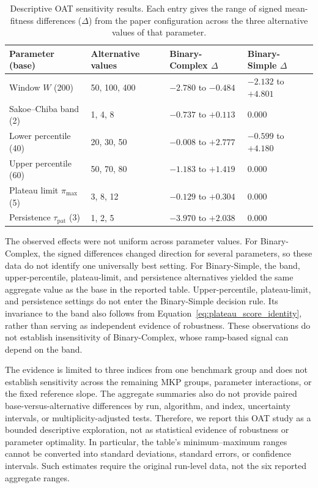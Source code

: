 \documentclass[journal,article,submit,moreauthors]{Definitions/mdpi}
\begin{document}
\begin{table}[htbp]
  \centering
  \small
  \caption{Descriptive OAT sensitivity results. Each entry gives the range of
  signed mean-fitness differences ($\Delta$) from the paper configuration
  across the three alternative values of that parameter.}
  \label{tab:oat_sensitivity}
  \begin{tabular}{llll}
    \toprule
    Parameter (base) & Alternative values & Binary-Complex $\Delta$ & Binary-Simple $\Delta$ \\
    \midrule
    Window $W$ (200) & 50, 100, 400 & $-2.780$ to $-0.484$ & $-2.132$ to $+4.801$ \\
    Sakoe--Chiba band (2) & 1, 4, 8 & $-0.737$ to $+0.113$ & $0.000$ \\
    Lower percentile (40) & 20, 30, 50 & $-0.008$ to $+2.777$ & $-0.599$ to $+4.180$ \\
    Upper percentile (60) & 50, 70, 80 & $-1.183$ to $+1.419$ & $0.000$ \\
    Plateau limit $\pi_{\max}$ (5) & 3, 8, 12 & $-0.129$ to $+0.304$ & $0.000$ \\
    Persistence $\tau_{\mathrm{pat}}$ (3) & 1, 2, 5 & $-3.970$ to $+2.038$ & $0.000$ \\
    \bottomrule
  \end{tabular}
\end{table}

The observed effects were not uniform across parameter values. For
Binary-Complex, the signed differences changed direction for several
parameters, so these data do not identify one universally best setting. For
Binary-Simple, the band, upper-percentile, plateau-limit, and persistence
alternatives yielded the same aggregate value as the base in the reported
table. Upper-percentile, plateau-limit, and persistence settings do not
enter the Binary-Simple decision rule. Its invariance to the band also
follows from Equation~\ref{eq:plateau_score_identity}, rather than serving
as independent evidence of robustness. These observations do not establish
insensitivity of Binary-Complex, whose ramp-based signal can depend on the band.

The evidence is limited to three indices from one benchmark group and does
not establish sensitivity across the remaining MKP groups, parameter
interactions, or the fixed reference slope. The aggregate summaries also do
not provide paired base-versus-alternative differences by run, algorithm,
and index, uncertainty intervals, or multiplicity-adjusted tests. Therefore,
we report this OAT study as a bounded descriptive exploration, not as
statistical evidence of robustness or parameter optimality. In particular,
the table's minimum--maximum ranges cannot be converted into standard
deviations, standard errors, or confidence intervals. Such estimates require
the original run-level data, not the six reported aggregate ranges.
\end{document}
